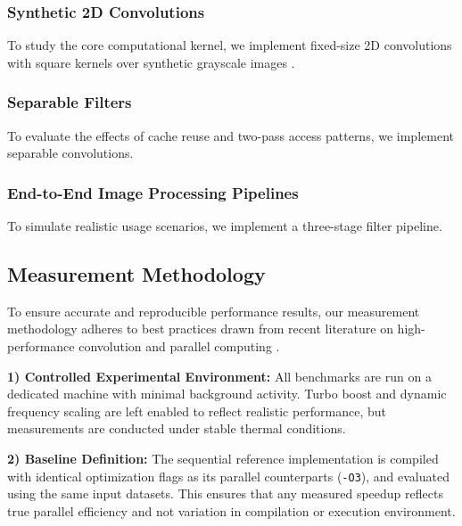 \documentclass[conference, 10pt]{IEEEtran}
\begin{document}
\begin{itemize}
\begin{itemize}
\subsubsection{\textbf{Synthetic 2D Convolutions}}

To study the core computational kernel, we implement fixed-size 2D convolutions with square kernels over synthetic grayscale images \cite{Tousimojarad2017}.


\subsubsection{\textbf{Separable Filters}}

To evaluate the effects of cache reuse and two-pass access patterns, we implement separable convolutions.



\subsubsection{\textbf{End-to-End Image Processing Pipelines}}

To simulate realistic usage scenarios, we implement a three-stage filter pipeline.



\subsection{\textbf{Measurement Methodology}}

To ensure accurate and reproducible performance results, our measurement methodology adheres to best practices drawn from recent literature on high-performance convolution and parallel computing \cite{Gawrych2023,  Rajput2013,  Yoon2012}.

\vspace{0.5em}
\textbf{1) Controlled Experimental Environment:} All benchmarks are run on a dedicated machine with minimal background activity. Turbo boost and dynamic frequency scaling are left enabled to reflect realistic performance, but measurements are conducted under stable thermal conditions.

\vspace{0.5em}
\textbf{2) Baseline Definition:} The sequential reference implementation is compiled with identical optimization flags as its parallel counterparts (\texttt{-O3}), and evaluated using the same input datasets. This ensures that any measured speedup reflects true parallel efficiency and not variation in compilation or execution environment.


\end{itemize}
\end{itemize}
\end{document}
